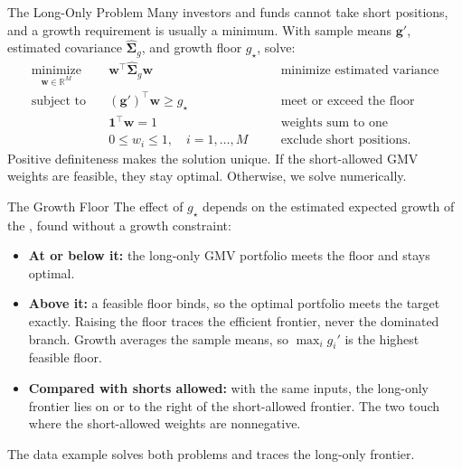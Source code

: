 \documentclass[aspectratio=169,11pt]{beamer}
\newcommand{\bw}{\mathbf{w}}
\newcommand{\bg}{\mathbf{g}}
\newcommand{\bone}{\mathbf{1}}
\newcommand{\Sg}{\hat{\boldsymbol{\Sigma}}_{g}}
\begin{document}
\begin{frame}{The Long-Only Problem}
  Many investors and funds cannot take short positions, and a growth
  requirement is usually a minimum. With sample means $\bg'$, estimated
  covariance $\Sg$, and growth floor $g_\star$, solve:
  \[
    \boxed{
    \begin{aligned}
      \underset{\bw\in\mathbb R^M}{\text{minimize}}\quad
        &\bw^{\top}\Sg\bw
        &&\quad\text{minimize estimated variance}\\
      \text{subject to}\quad
        &(\bg')^{\top}\bw\ge g_\star
        &&\quad\text{meet or exceed the floor}\\
        &\bone^{\top}\bw=1
        &&\quad\text{weights sum to one}\\
        &0\le w_i\le1,\quad i=1,\ldots,M
        &&\quad\text{exclude short positions}.
    \end{aligned}}
  \]
  Positive definiteness makes the solution unique. If the short-allowed GMV
  weights are feasible, they stay optimal. Otherwise, we solve numerically.
\end{frame}

\begin{frame}{The Growth Floor}
  The effect of $g_\star$ depends on the estimated expected growth of the
  , found without a growth constraint:
  \begin{itemize}\setlength{\itemsep}{0.45em}
    \item \textbf{At or below it:} the long-only GMV portfolio meets the
      floor and stays optimal.
    \item \textbf{Above it:} a feasible floor binds, so the optimal portfolio
      meets the target exactly. Raising the floor traces the efficient frontier,
      never the dominated branch. Growth averages the sample means,
      so $\max_i g_i'$ is the highest feasible floor.
    \item \textbf{Compared with shorts allowed:} with the same inputs, the
      long-only frontier lies on or to the right of the short-allowed frontier.
      The two touch where the short-allowed weights are nonnegative.
  \end{itemize}

  The data example solves both problems and traces the long-only frontier.
\end{frame}
\end{document}
